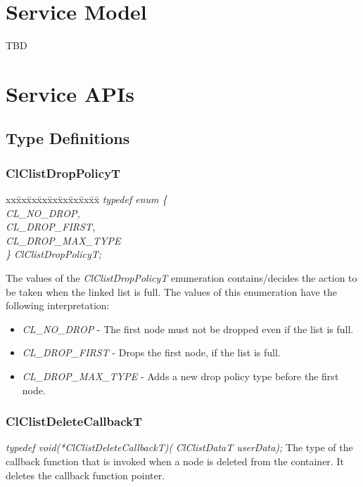 \begin{flushleft}
\chapter{Service Model}
TBD


\chapter{Service APIs}


\section{Type Definitions}

\subsection{ClClistDropPolicyT}
\begin{tabbing}
xx\=xx\=xx\=xx\=xx\=xx\=xx\=xx\=xx\=\kill
\textit{typedef enum \{}\\
\>\>\>\>\textit{CL\_NO\_DROP,}\\
\>\>\>\>\textit{CL\_DROP\_FIRST,}\\
\>\>\>\>\textit{CL\_DROP\_MAX\_TYPE}\\
\textit{\} ClClistDropPolicyT;}\end{tabbing}
The values of the \textit{ClClistDropPolicyT} enumeration contains/decides the action to be taken when the linked list is full.
The values of this enumeration have the following interpretation:
\begin{itemize}
\item
\textit{CL\_\-NO\_\-DROP} - The first node must not be dropped even if the list is full.
\item
\textit{CL\_\-DROP\_\-FIRST} - Drops the first node, if the list is full.
\item
\textit{CL\_\-DROP\_\-MAX\_\-TYPE} - Adds a new drop policy type before the first node.
\end{itemize}


\subsection{ClClistDeleteCallbackT}
\textit{typedef void(*ClClistDeleteCallbackT)(}
\newline \textit{ClClistDataT userData);}
\newline
\newline
The type of the callback function that is invoked when a node is deleted from the container. It deletes the callback function pointer.



\end{flushleft}
